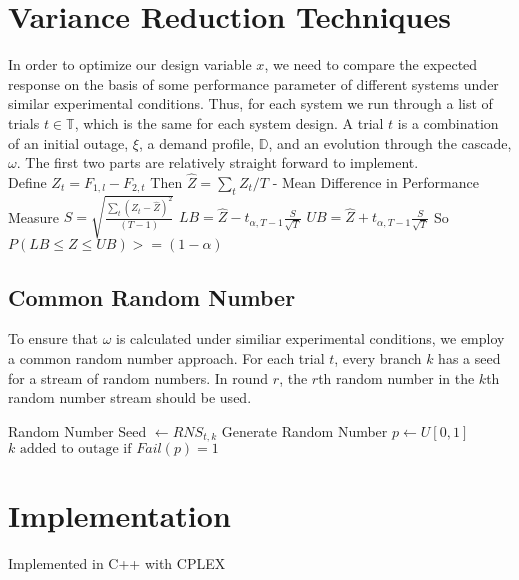 \section{Variance Reduction Techniques}\label{var}
In order to optimize our design variable $x$, we need to compare the expected response on the basis of some performance parameter of different systems under similar experimental conditions.  Thus, for each system we run through a list of trials $t \in \mathbb{T}$, which is the same for each system design.  A trial $t$ is a combination of an initial outage, $\xi$, a demand profile, $\mathbb{D}$, and an evolution through the cascade, $\omega$.  The first two parts are relatively straight forward to implement. \\
\newline
Define $Z_t = F_{1,l} - F_{2,t} $\newline
Then $\hat{Z} = \sum_t Z_t / T $ - Mean Difference in Performance Measure \newline
$ S = \sqrt{ \frac{\sum_t  \left( Z_t - \hat{Z} \right)^2 }{  \left( T-1 \right)  }} $ \newline
$ LB = \hat{Z} - t_{\alpha,T-1} \frac{S}{\sqrt{T}} $ \newline
$ UB = \hat{Z} + t_{\alpha,T-1} \frac{S}{\sqrt{T}} $ \newline
So\newline
$ P ( LB \leq Z \leq UB ) >= (1-\alpha) $
\subsection{Common Random Number}\label{crn}
 To ensure that $\omega$ is calculated under similiar experimental conditions, we employ a common random number approach.  For each trial $t$, every branch $k$ has a seed for a stream of random numbers.  In round $r$, the $r$th random number in the $k$th random number stream should be used.\\
 \begin{algorithmic}
 					\STATE Random Number Seed $ \gets RNS_{t,k} $
 							\STATE Generate Random Number
 					\ENDFOR
 					\STATE $p \gets U \left[ 0, 1\right] $
 					\STATE ${k} \mbox{ added to outage if } Fail(p) = 1 $
 		\ENDIF
 \ENDFOR
 \end{algorithmic}
\section{Implementation}\label{imp}
Implemented in C++ with CPLEX

